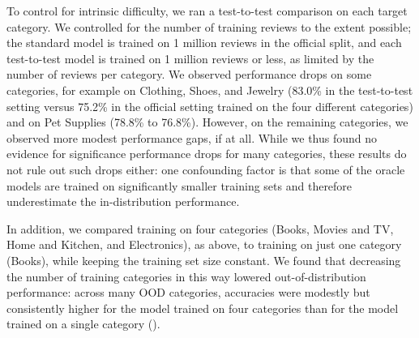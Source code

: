 To control for intrinsic difficulty, we ran a test-to-test comparison on each target category.
We controlled for the number of training reviews to the extent possible;
the standard model is trained on 1 million reviews in the official split, and each test-to-test model is trained on 1 million reviews or less, as limited by the number of reviews per category.
We observed performance drops on some categories, for example on Clothing, Shoes, and Jewelry (83.0\% in the test-to-test setting versus 75.2\% in the official setting trained on the four different categories) and on Pet Supplies (78.8\% to 76.8\%).
However, on the remaining categories, we observed more modest performance gaps, if at all.
While we thus found no evidence for significance performance drops for many categories, these results do not rule out such drops either:
one confounding factor is that some of the oracle models are trained on significantly smaller training sets and therefore underestimate the in-distribution performance.

In addition, we compared training on four categories (Books, Movies and TV, Home and Kitchen, and Electronics), as above, to training on just one category (Books), while keeping the training set size constant.
We found that decreasing the number of training categories in this way lowered out-of-distribution performance:
across many OOD categories, accuracies were modestly but consistently higher for the model trained on four categories than for the model trained on a single category ().
